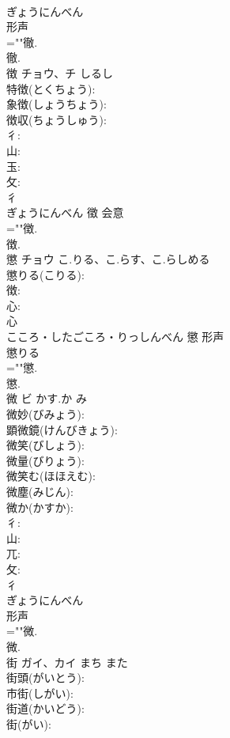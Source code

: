 \documentclass[8pt]{extreport}
\begin{document}
\begin{CJK}{UTF8}{min}
\\	ぎょうにんべん	
\\	形声 
\\	=""徹.
\\	徹.
\\	徴	チョウ、チ	しるし		
\\	特徴(とくちょう): 
\\	象徴(しょうちょう): 
\\	徴収(ちょうしゅう): 
\\	彳: 
\\	山: 
\\	玉: 
\\	攵: 
\\	彳	
\\	ぎょうにんべん	徵	会意 
\\	=""徴.
\\	徴.
\\	懲	チョウ	こ.りる、こ.らす、こ.らしめる		
\\	懲りる(こりる): 
\\	徴: 
\\	心: 
\\	心	
\\	こころ・したごころ・りっしんべん	懲	形声 
\\	懲りる 
\\	=""懲.
\\	懲.
\\	微	ビ	かす.か	み	
\\	微妙(びみょう): 
\\	顕微鏡(けんびきょう): 
\\	微笑(びしょう): 
\\	微量(びりょう): 
\\	微笑む(ほほえむ): 
\\	微塵(みじん): 
\\	微か(かすか): 
\\	彳: 
\\	山: 
\\	兀: 
\\	攵: 
\\	彳	
\\	ぎょうにんべん	
\\	形声 
\\	=""微.
\\	微.
\\	街	ガイ、カイ	まち	また	
\\	街頭(がいとう): 
\\	市街(しがい): 
\\	街道(かいどう): 
\\	街(がい): 

\end{CJK}
\end{document}
